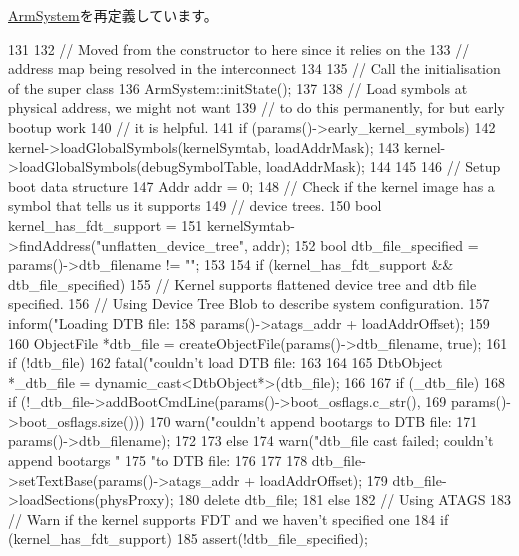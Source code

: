 \hyperlink{classArmSystem_a3c34ea9b29f410748d4435a667484924}{ArmSystem}を再定義しています。


\begin{DoxyCode}
131 {
132     // Moved from the constructor to here since it relies on the
133     // address map being resolved in the interconnect
134 
135     // Call the initialisation of the super class
136     ArmSystem::initState();
137 
138     // Load symbols at physical address, we might not want
139     // to do this permanently, for but early bootup work
140     // it is helpful.
141     if (params()->early_kernel_symbols) {
142         kernel->loadGlobalSymbols(kernelSymtab, loadAddrMask);
143         kernel->loadGlobalSymbols(debugSymbolTable, loadAddrMask);
144     }
145 
146     // Setup boot data structure
147     Addr addr = 0;
148     // Check if the kernel image has a symbol that tells us it supports
149     // device trees.
150     bool kernel_has_fdt_support =
151         kernelSymtab->findAddress("unflatten_device_tree", addr);
152     bool dtb_file_specified = params()->dtb_filename != "";
153 
154     if (kernel_has_fdt_support && dtb_file_specified) {
155         // Kernel supports flattened device tree and dtb file specified.
156         // Using Device Tree Blob to describe system configuration.
157         inform("Loading DTB file: %
158                 params()->atags_addr + loadAddrOffset);
159 
160         ObjectFile *dtb_file = createObjectFile(params()->dtb_filename, true);
161         if (!dtb_file) {
162             fatal("couldn't load DTB file: %
163         }
164 
165         DtbObject *_dtb_file = dynamic_cast<DtbObject*>(dtb_file);
166 
167         if (_dtb_file) {
168             if (!_dtb_file->addBootCmdLine(params()->boot_osflags.c_str(),
169                                            params()->boot_osflags.size())) {
170                 warn("couldn't append bootargs to DTB file: %
171                      params()->dtb_filename);
172             }
173         } else {
174             warn("dtb_file cast failed; couldn't append bootargs "
175                  "to DTB file: %
176         }
177 
178         dtb_file->setTextBase(params()->atags_addr + loadAddrOffset);
179         dtb_file->loadSections(physProxy);
180         delete dtb_file;
181     } else {
182         // Using ATAGS
183         // Warn if the kernel supports FDT and we haven't specified one
184         if (kernel_has_fdt_support) {
185             assert(!dtb_file_specified);
}}}
\end{DoxyCode}
